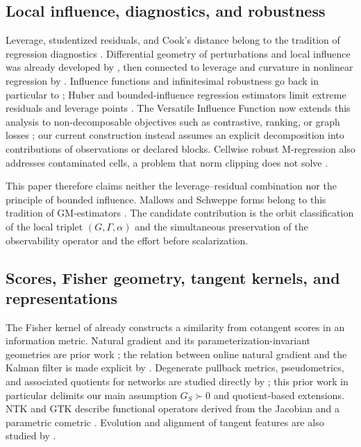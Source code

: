 \documentclass[10pt,a4paper]{article}
\begin{document}
\subsection{Local influence, diagnostics, and robustness}
Leverage, studentized residuals, and Cook's distance belong to the tradition of regression diagnostics \citep{cook1977}. Differential geometry of perturbations and local influence was already developed by \citet{cook1986}, then connected to leverage and curvature in nonlinear regression by \citet{stlaurent1993}. Influence functions and infinitesimal robustness go back in particular to \citet{hampel1974}; Huber and bounded-influence regression estimators limit extreme residuals and leverage points \citep{huber1964,mallows1975,krasker1982,richardson1997}. The Versatile Influence Function now extends this analysis to non-decomposable objectives such as contrastive, ranking, or graph losses \citep{deng2025vif}; our current construction instead assumes an explicit decomposition into contributions of observations or declared blocks. Cellwise robust M-regression also addresses contaminated cells, a problem that norm clipping does not solve \citep{filzmoser2020}.

This paper therefore claims neither the leverage--residual combination nor the principle of bounded influence. Mallows and Schweppe forms belong to this tradition of GM-estimators \citep{mallows1975,richardson1997,maronna2006robust}. The candidate contribution is the orbit classification of the local triplet $(G,\Gamma,\alpha)$ and the simultaneous preservation of the observability operator and the effort before scalarization.

\subsection{Scores, Fisher geometry, tangent kernels, and representations}
The Fisher kernel of \citet{jaakkola1998} already constructs a similarity from cotangent scores in an information metric. Natural gradient and its parameterization-invariant geometries are prior work \citep{amari1998,ollivier2015,martens2020}; the relation between online natural gradient and the Kalman filter is made explicit by \citet{ollivier2017}. Degenerate pullback metrics, pseudometrics, and associated quotients for networks are studied directly by \citet{benfenati2023singular}; this prior work in particular delimits our main assumption $G_S\succ0$ and quotient-based extensions. NTK and GTK describe functional operators derived from the Jacobian and a parametric cometric \citep{jacot2018,bai2025gtk}. Evolution and alignment of tangent features are also studied by \citet{baratin2021}.
\end{document}
